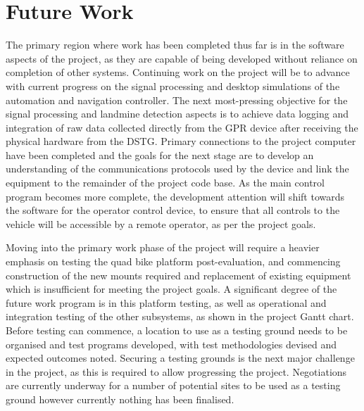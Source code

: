 \documentclass[main.tex]{subfiles}
\begin{document}
\section{Future Work}


The primary region where work has been completed thus far is in the software aspects of the project, as they are capable of being developed without reliance on completion of other systems. Continuing work on the project will be to advance with current progress on the signal processing and desktop simulations of the automation and navigation controller. 
The next most-pressing objective for the signal processing and landmine detection aspects is to achieve data logging and integration of raw data collected directly from the GPR device after receiving the physical hardware from the DSTG. 
Primary connections to the project computer have been completed and the goals for the next stage are to develop an understanding of the communications protocols used by the device and link the equipment to the remainder of the project code base.
As the main control program becomes more complete, the development attention will shift towards the software for the operator control device, to ensure that all controls to the vehicle will be accessible by a remote operator, as per the project goals.

Moving into the primary work phase of the project will require a heavier emphasis on testing the quad bike platform post-evaluation, and commencing construction of the new mounts required and replacement of existing equipment which is insufficient for meeting the project goals. A significant degree of the future work program is in this platform testing, as well as operational and integration testing of the other subsystems, as shown in the project Gantt chart. 
Before testing can commence, a location to use as a testing ground needs to be organised and test programs developed, with test methodologies devised and expected outcomes noted. Securing a testing grounds is the next major challenge in the project, as this is required to allow progressing the project. 
Negotiations are currently underway for a number of potential sites to be used as a testing ground however currently nothing has been finalised.
\end{document}
